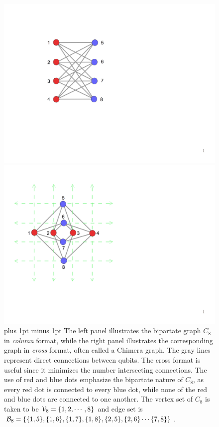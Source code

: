 \documentclass[preprint,12pt,eqsecnum,nofootinbib,amsmath,amssymb]{revtex4}
\newcommand{\footnoteskip}{\baselineskip 12pt plus 1pt minus 1pt}
\begin{document}
%
\begin{figure}[h!]
\begin{minipage}[c]{0.4\linewidth}
\includegraphics[scale=0.40]{figs/bipartate8_0.png}
\end{minipage}
\hfill
\begin{minipage}[c]{0.4\linewidth}
\includegraphics[scale=0.35]{figs/bipartate8_1.png}
\end{minipage}
\vskip-2.0cm
\caption{\footnoteskip
The left panel illustrates the bipartate graph $C_8$ in {\em column} format, 
while the right panel illustrates the corresponding graph in {\em cross} format,
often called a Chimera graph. The gray lines represent direct connections 
between qubits. The cross format is useful since it minimizes the number 
intersecting connections. The use of red and blue dots emphasize the bipartate 
nature of $C_8$, as every red dot is connected to every blue dot, while none 
of the red and blue dots are connected to one another. The vertex set of
$C_8$ is taken to be ${\cal V}_8 = \{1, 2, \cdots, 8 \}$ and edge set is 
${\cal B}_8 = \{ \{1, 5\} , \{1, 6\} , \{1, 7\} , \{1, 8\} , \{2, 5\} ,\{2, 6\} 
\cdots \{ 7, 8\} \}$. 
}
\label{fig_chimera_topology}
\end{figure}
%
\end{document}
